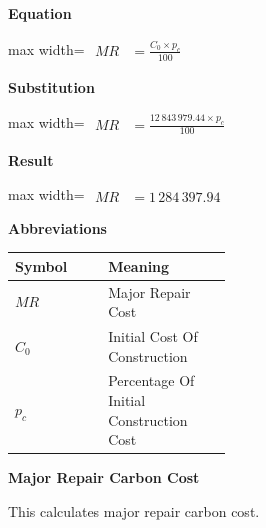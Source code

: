 \documentclass{article}
\begin{document}
\vspace{0.4em}
\textbf{Equation}\par\vspace{-0.35em}
\begin{center}
\begin{adjustbox}{max width=\linewidth}
$\displaystyle\begin{aligned}
MR &= \frac{C_0 \times p_c}{100}
\end{aligned}$
\end{adjustbox}
\end{center}
\vspace{0.4em}
\textbf{Substitution}\par\vspace{-0.35em}
\begin{center}
\begin{adjustbox}{max width=\linewidth}
$\displaystyle\begin{aligned}
MR &= \frac{12\,843\,979.44 \times p_c}{100}
\end{aligned}$
\end{adjustbox}
\end{center}
\vspace{0.4em}
\textbf{Result}\par\vspace{-0.35em}
\begin{center}
\begin{adjustbox}{max width=\linewidth}
$\displaystyle\begin{aligned}
MR &= 1\,284\,397.94
\end{aligned}$
\end{adjustbox}
\end{center}
\vspace{0.4em}
\textbf{Abbreviations}\par\vspace{-0.35em}
\begin{tabularx}{\linewidth}{>{\raggedright\arraybackslash}p{0.43\linewidth} >{\raggedright\arraybackslash}X}
\toprule
Symbol & Meaning \\
\midrule
$MR$ & Major Repair Cost \\
$C_0$ & Initial Cost Of Construction \\
$p_c$ & Percentage Of Initial Construction Cost \\
\bottomrule
\end{tabularx}
\vspace{0.6em}
\vspace{0.4em}
\textbf{Major Repair Carbon Cost}\par\vspace{-0.35em}
This calculates major repair carbon cost.
\end{document}
